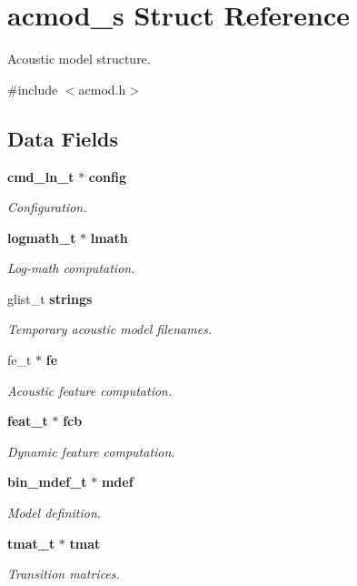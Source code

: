 \section{acmod\-\_\-s Struct Reference}
\label{structacmod__s}


Acoustic model structure.  




{\ttfamily \#include $<$acmod.\-h$>$}

\subsection*{Data Fields}
\begin{DoxyCompactItemize}
\item 
{\bf cmd\-\_\-ln\-\_\-t} $\ast$ {\bf config}
\begin{DoxyCompactList}\small\item\em Configuration. \end{DoxyCompactList}\item 
{\bf logmath\-\_\-t} $\ast$ {\bf lmath}
\begin{DoxyCompactList}\small\item\em Log-\/math computation. \end{DoxyCompactList}\item 
glist\-\_\-t {\bf strings}
\begin{DoxyCompactList}\small\item\em Temporary acoustic model filenames. \end{DoxyCompactList}\item 
fe\-\_\-t $\ast$ {\bf fe}
\begin{DoxyCompactList}\small\item\em Acoustic feature computation. \end{DoxyCompactList}\item 
{\bf feat\-\_\-t} $\ast$ {\bf fcb}
\begin{DoxyCompactList}\small\item\em Dynamic feature computation. \end{DoxyCompactList}\item 
{\bf bin\-\_\-mdef\-\_\-t} $\ast$ {\bf mdef}
\begin{DoxyCompactList}\small\item\em Model definition. \end{DoxyCompactList}\item 
{\bf tmat\-\_\-t} $\ast$ {\bf tmat}
\begin{DoxyCompactList}\small\item\em Transition matrices. \end{DoxyCompactList}\item 

\end{DoxyCompactItemize}

